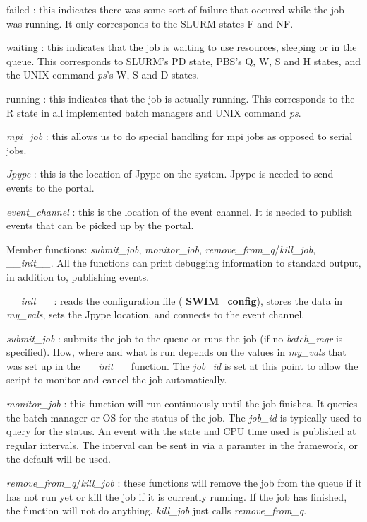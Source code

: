 \begin{itemizer}
\begin{itemizer}
\begin{itemizer}
    \item  failed : this indicates there was some sort of failure that occured
      while the job was running.  It only corresponds to the SLURM states F and
      NF.
    \item  waiting : this indicates that the job is waiting to use resources,
      sleeping or in the queue.  This corresponds to SLURM's PD state, PBS's Q,
      W, S and H states, and the UNIX command {\em ps}'s W, S and D states.
    \item  running : this indicates that the job is actually running.  This
      corresponds to the R state in all implemented batch managers and UNIX
      command {\em ps}.
    \end{itemizer}
  \item  {\em mpi\_job} : this allows us to do special handling for mpi jobs as
    opposed to serial jobs.
  \item  {\em Jpype} : this is the location of Jpype on the system.  Jpype is
    needed to send events to the portal.
  \item  {\em event\_channel} : this is the location of the event channel.  It
    is needed to publish events that can be picked up by the portal.
  \end{itemizer}
\item Member functions: {\em submit\_job}, {\em monitor\_job}, {\em
  remove\_from\_q}/{\em kill\_job}, {\em \_\_init\_\_}.  All the functions can
  print debugging information to standard output, in addition to, publishing events.
  \begin{itemizer}
  \item  {\em \_\_init\_\_} : reads the configuration file ({\bf
    SWIM\_config}), stores the data in {\em my\_vals}, sets the Jpype location, and
    connects to the event channel.
  \item  {\em submit\_job} : submits the job to the queue or runs the job
    (if no {\em batch\_mgr} is specified).  How, where and what is run depends
    on the values in {\em
     my\_vals} that was set up in the {\em \_\_init\_\_} function.  The {\em
     job\_id} is set at this point to allow the script to monitor and cancel the job
    automatically.
  \item  {\em monitor\_job} : this function will run continuously until the job
    finishes.  It queries the batch manager or OS for the status of the job.
    The {\em job\_id} is typically used to query for the status.  An event with
    the state and CPU time used is published at regular intervals.  The
    interval can be sent in via a paramter in the framework, or the default
    will be used.
  \item  {\em remove\_from\_q}/{\em kill\_job} : these functions will remove
    the job from the queue if it has not run yet or kill the job if it is
    currently running.  If the job has finished, the function will not do
    anything.  {\em kill\_job} just calls {\em remove\_from\_q}.
  \end{itemizer}
\end{itemizer}

